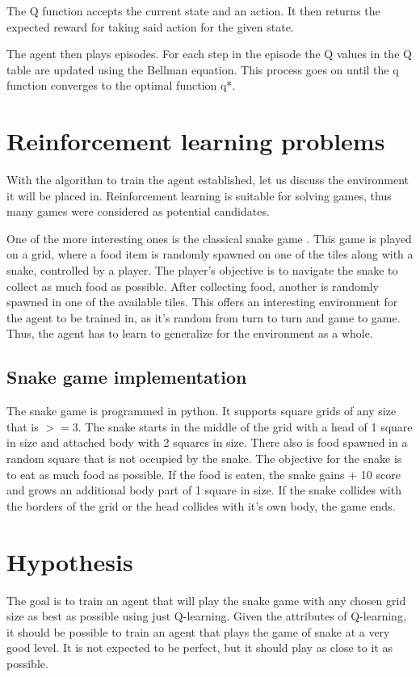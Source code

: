 \documentclass[lettersize,journal]{IEEEtran}
\begin{document}
The Q function accepts the current state and an action. It then
returns the expected reward for taking said action for the given
state.

The agent then plays episodes. For each step in the episode
the Q values in the Q table are updated using the Bellman
equation. This process goes on until the q function converges
to the optimal function q*.


\section{Reinforcement learning problems}
With the algorithm to train the agent established, let us
discuss the environment it will be placed in.
Reinforcement learning is suitable for solving games, thus
many games were considered as potential candidates.

One of the more interesting ones is the classical snake game \cite{snake}.
This game is played on a grid, where a food item is randomly
spawned on one of the tiles along with a snake, controlled
by a player. The player's objective is to navigate the snake to collect
as much food as possible. After collecting food, another is randomly spawned
in one of the available tiles. This offers an interesting environment
for the agent to be trained in, as it's random from turn to turn and game
to game. Thus, the agent has to learn to generalize for the environment as a whole.


\subsection{Snake game implementation}
The snake game is programmed in python.
It supports square grids of any size that is $>= 3$.
The snake starts in the middle of the grid with a head of
1 square in size and attached
body with 2 squares in size. There also is food spawned in a random
square that is not occupied by the snake. The objective for the
snake is to eat as much food as possible. If the food is eaten,
the snake gains + 10 score and grows an additional body part of
1 square in size. If the snake collides with the borders of the grid
or the head collides with it's own body, the game ends.\label{game-over}


\section{Hypothesis}\label{hyp}
The goal is to train an agent that will play the snake game
with any chosen grid size as best as possible using just Q-learning.
Given the attributes of Q-learning, it should be possible to train
an agent that plays the game of snake at a very good level. It
is not expected to be perfect, but it should play as close to it
as possible.
\end{document}
